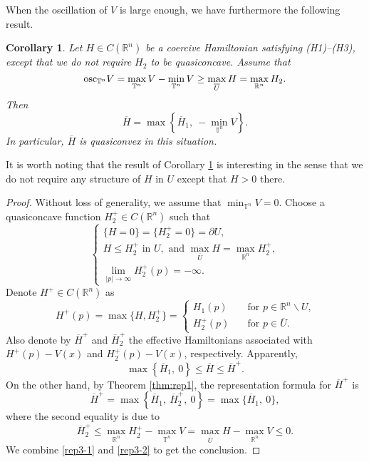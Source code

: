 \documentclass[12pt,reqno]{amsart}
\theoremstyle{plain}
\newtheorem{cor}[thm]{Corollary}
\theoremstyle{remark}
\numberwithin{equation}{section}
\newcommand{\R}{\mathbb{R}}
\newcommand{\T}{\mathbb{T}}
\newcommand{\ol}{\overline}
\begin{document}
When the oscillation of $V$ is large enough, we have furthermore the following result.

\begin{cor}\label{cor:rep3}   
Let $H\in C(\R^n)$ be a coercive Hamiltonian satisfying {\rm (H1)--(H3)}, 
except that we do not require $H_2$ to be quasiconcave.   
Assume that  
\[
{\rm osc_{\T^n}}V=\max_{\T^n}V-\min_{\T^n}V\geq  \max_{\ol{U}}H=\max_{\R ^n}H_2.
\] 
Then
\[
\ol H=\max\left\{ \ol H_1,  \  -\min_{\T^n}V \right\}.
\]
In particular,  $\ol H$ is quasiconvex in this situation. 
\end{cor}

It is worth noting that the result of Corollary \ref{cor:rep3} is  interesting in the sense that
we do not require any structure of $H$ in $U$ except that $H>0$ there.


\begin{proof}
 Without loss of generality,  we assume that $\min_{\T^n}V=0$.  
 Choose a quasiconcave function $H_{2}^{+} \in C(\R^n)$ such that 
\[
\begin{cases}
\{H=0\}=\{H_{2}^{+}=0\}=\partial U,\\
 H\leq H_{2}^{+}   \text{ in } U, \text{ and }   \max_{\ol{U}}H=\max_{\R ^n}H_{2}^{+},\\
 \lim_{|p| \to \infty} H_2^+(p)=-\infty.
\end{cases}
\]
Denote $H^{+} \in C(\R^n)$ as
\[
H^{+}(p)=\max\{H, H_{2}^{+}\}=
\begin{cases}
H_1(p)  \quad &\text{for $p\in \R^n\backslash  U$,}\\
H_{2}^{+}(p)   \quad &\text{for $p\in \ol{U}$}.
\end{cases}
\]
Also denote by $\ol H^{+}$ and $\ol H_{2}^{+}$ the effective Hamiltonians associated with $H^+(p)-V(x)$ and $H_{2}^{+}(p)-V(x)$,  respectively.  
Apparently,
\begin{equation}\label{rep3-1}
\max\left\{ \ol H_1,  \  0\right\} \leq \ol H\leq \ol H^{+}.
\end{equation}
On the other hand,  by Theorem  \ref{thm:rep1},  the representation formula for $\ol{H}^+$ is
\begin{equation}\label{rep3-2}
\ol H^{+}=\max\left\{ \ol H_1,\  \ol H_{2}^{+},  \  0\right\}=\max\{ \ol H_1,  \  0 \},
\end{equation}
where the second equality is due to
\[
\ol H_{2}^{+}\leq \max_{\R ^n}H_{2}^{+}-\max_{\T ^n}V=\max_{\bar U}H-\max_{\R ^n}V\leq 0.
\]
We combine \eqref{rep3-1} and \eqref{rep3-2} to get the conclusion.
\end{proof}
\end{document}
